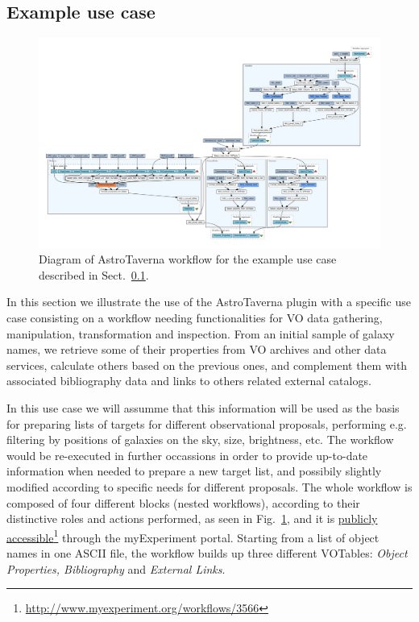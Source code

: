 \documentclass{aa}
\newcommand{\urlsamefont}[1]{\urlstyle{same}\url{#1}}
\newcommand{\hrefnote}[2]{\href{#1}{#2}\footnote{\urlsamefont{#1}}}
\begin{document}
\subsection{Example use case}
\label{Usecase}

\begin{figure}[tb]
\centering 
\includegraphics[width=17cm]{WfDiagram}
\caption{Diagram of AstroTaverna workflow for the example use case described in Sect.~\ref{Usecase}.}
\label{fig:WfDiagram}
\end{figure}

In this section we illustrate the use of the AstroTaverna plugin with a specific use case consisting on a workflow needing functionalities for VO data gathering, manipulation, transformation and inspection. From an initial sample of galaxy names, we retrieve some of their properties from VO archives and other data services, calculate others based on the previous ones, and complement them with associated bibliography data and links to others related external catalogs.

In this use case we will assumme that this information will be used as the basis for preparing lists of targets for different observational proposals, performing e.g. filtering by positions of galaxies on the sky, size, brightness, etc. The workflow would be re-executed in further occassions in order to provide up-to-date information when needed to prepare a new target list, and possibily slightly modified according to specific needs for different proposals. The whole workflow is composed of four different blocks (nested workflows), according to their distinctive roles and actions performed, as seen in Fig.~\ref{fig:WfDiagram}, and it is \hrefnote{http://www.myexperiment.org/workflows/3566}{publicly accessible} through the myExperiment portal. Starting from a list of object names in one ASCII file, the workflow builds up three different VOTables: \textit{Object Properties, Bibliography} and \textit{External Links}.
\end{document}
